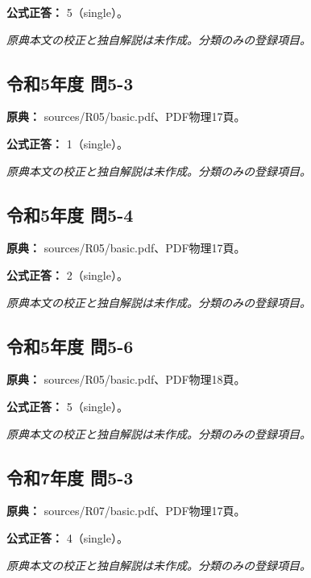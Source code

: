 \textbf{公式正答：} 5（single）。

\par\textit{原典本文の校正と独自解説は未作成。分類のみの登録項目。}

\subsection{令和5年度 問5-3}
\label{q:r05-reg-basic-5-3}

\noindent\textbf{原典：} sources/R05/basic.pdf、PDF物理17頁。

\textbf{公式正答：} 1（single）。

\par\textit{原典本文の校正と独自解説は未作成。分類のみの登録項目。}

\subsection{令和5年度 問5-4}
\label{q:r05-reg-basic-5-4}

\noindent\textbf{原典：} sources/R05/basic.pdf、PDF物理17頁。

\textbf{公式正答：} 2（single）。

\par\textit{原典本文の校正と独自解説は未作成。分類のみの登録項目。}

\subsection{令和5年度 問5-6}
\label{q:r05-reg-basic-5-6}

\noindent\textbf{原典：} sources/R05/basic.pdf、PDF物理18頁。

\textbf{公式正答：} 5（single）。

\par\textit{原典本文の校正と独自解説は未作成。分類のみの登録項目。}

\subsection{令和7年度 問5-3}
\label{q:r07-reg-basic-5-3}

\noindent\textbf{原典：} sources/R07/basic.pdf、PDF物理17頁。

\textbf{公式正答：} 4（single）。

\par\textit{原典本文の校正と独自解説は未作成。分類のみの登録項目。}
